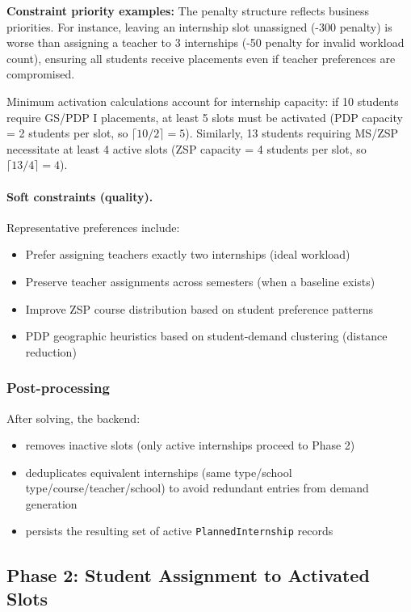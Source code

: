 \documentclass[12pt,a4paper]{report}
\begin{document}
\textbf{Constraint priority examples:}
The penalty structure reflects business priorities. For instance, leaving an internship slot unassigned (-300 penalty) is worse than assigning a teacher to 3 internships (-50 penalty for invalid workload count), ensuring all students receive placements even if teacher preferences are compromised.

Minimum activation calculations account for internship capacity: if 10 students require GS/PDP I placements, at least 5 slots must be activated (PDP capacity = 2 students per slot, so $\lceil 10/2 \rceil = 5$). Similarly, 13 students requiring MS/ZSP necessitate at least 4 active slots (ZSP capacity = 4 students per slot, so $\lceil 13/4 \rceil = 4$).

\paragraph{Soft constraints (quality).}
Representative preferences include:
\begin{itemize}
    \item Prefer assigning teachers exactly two internships (ideal workload)
    \item Preserve teacher assignments across semesters (when a baseline exists)
    \item Improve ZSP course distribution based on student preference patterns
    \item PDP geographic heuristics based on student-demand clustering (distance reduction)
\end{itemize}

\subsubsection*{Post-processing}

After solving, the backend:
\begin{itemize}
    \item removes inactive slots (only active internships proceed to Phase 2)
    \item deduplicates equivalent internships (same type/school type/course/teacher/school) to avoid redundant entries from demand generation
    \item persists the resulting set of active \texttt{PlannedInternship} records
\end{itemize}

\subsection{Phase 2: Student Assignment to Activated Slots}
\end{document}
